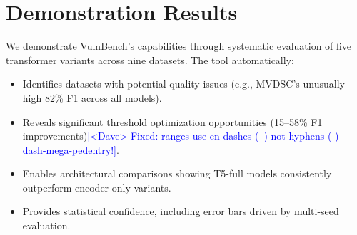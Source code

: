 \documentclass[letterpaper]{article}
\newcommand{\note}[2][red]{\textcolor{#1}{#2}}
\newcommand{\notedme}[1]{\note[blue]{[<Dave> #1]}}
\begin{document}
\section{Demonstration Results}


\begin{table}[ht]
	\centering
	\caption{Model Performance (F1-Score \%) with Optimized Thresholds
	{\Huge TINY TABLE. Resizebox is \textbf{EVIL}!}
	}
	\label{tab:results}
\end{table}
We demonstrate VulnBench's capabilities through systematic evaluation of five transformer variants across nine datasets. The tool automatically:

\begin{itemize}
	\item Identifies datasets with potential quality issues (e.g., MVDSC's unusually high 82\% F1 across all models).
	\item Reveals significant threshold optimization opportunities (15--58\% F1 improvements)\notedme{Fixed: ranges use en-dashes (--) not hyphens (-)---dash-mega-pedentry!}.
	\item Enables architectural comparisons showing T5-full models consistently outperform encoder-only variants.
	\item Provides statistical confidence, including error bars driven by multi-seed evaluation.
\end{itemize}
\end{document}
